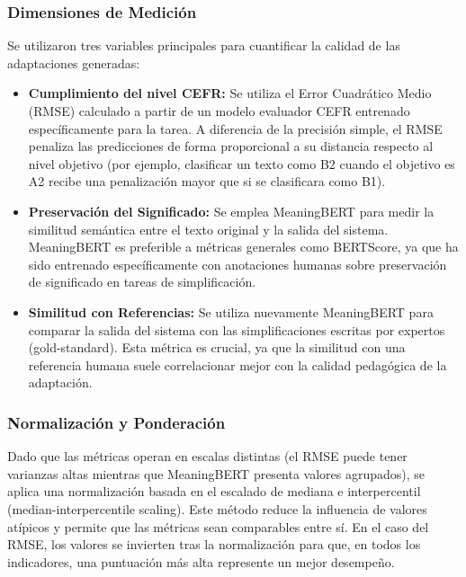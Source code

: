 \subsubsection*{Dimensiones de Medición}

Se utilizaron tres variables principales para cuantificar la calidad de las adaptaciones generadas:

\begin{itemize}
    \item \textbf{Cumplimiento del nivel CEFR:} Se utiliza el Error Cuadrático Medio (RMSE) calculado a partir de un modelo evaluador CEFR entrenado específicamente para la tarea. A diferencia de la precisión simple, el RMSE penaliza las predicciones de forma proporcional a su distancia respecto al nivel objetivo (por ejemplo, clasificar un texto como B2 cuando el objetivo es A2 recibe una penalización mayor que si se clasificara como B1).

    \item \textbf{Preservación del Significado:} Se emplea MeaningBERT para medir la similitud semántica entre el texto original y la salida del sistema. MeaningBERT es preferible a métricas generales como BERTScore, ya que ha sido entrenado específicamente con anotaciones humanas sobre preservación de significado en tareas de simplificación.
    
    \item \textbf{Similitud con Referencias:} Se utiliza nuevamente MeaningBERT para comparar la salida del sistema con las simplificaciones escritas por expertos (gold-standard). Esta métrica es crucial, ya que la similitud con una referencia humana suele correlacionar mejor con la calidad pedagógica de la adaptación.
\end{itemize}

\subsubsection*{Normalización y Ponderación}

Dado que las métricas operan en escalas distintas (el RMSE puede tener varianzas altas mientras que MeaningBERT presenta valores agrupados), se aplica una normalización basada en el escalado de mediana e interpercentil (median-interpercentile scaling). Este método reduce la influencia de valores atípicos y permite que las métricas sean comparables entre sí. En el caso del RMSE, los valores se invierten tras la normalización para que, en todos los indicadores, una puntuación más alta represente un mejor desempeño.

